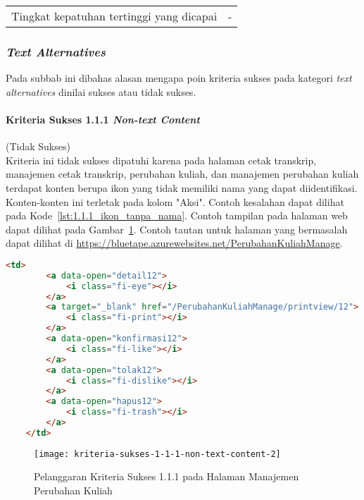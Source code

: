 \begin{center}
\begin{longtable}{|c|c|c|}
    \hline
    \multicolumn{2}{|c|}{Tingkat kepatuhan tertinggi yang dicapai} & - \\

\end{longtable}
\end{center}

\subsubsection{\textit{Text Alternatives}}
\label{subsubsec:kepatuhan_bluetape_text_alternatives}
Pada subbab ini dibahas alasan mengapa poin kriteria sukses pada kategori \textit{text alternatives} dinilai sukses atau tidak sukses.

\paragraph{Kriteria Sukses 1.1.1 \textit{Non-text Content}}
\label{par:kepatuhan_bluetape_kriteria_sukses_1.1.1}
(Tidak Sukses)\\

Kriteria ini tidak sukses dipatuhi karena pada halaman cetak transkrip, manajemen cetak transkrip, perubahan kuliah, dan manajemen perubahan kuliah terdapat konten berupa ikon yang tidak memiliki nama yang dapat diidentifikasi. Konten-konten ini terletak pada kolom "Aksi". Contoh kesalahan dapat dilihat pada \mbox{Kode \ref{lst:1.1.1_ikon_tanpa_nama}}. Contoh tampilan pada halaman web dapat dilihat pada \mbox{Gambar \ref{fig:1.1.1_non_text_content_2}}. Contoh tautan untuk halaman yang bermasalah dapat dilihat di \url{https://bluetape.azurewebsites.net/PerubahanKuliahManage}.
\begin{lstlisting}[frame=single, label={lst:1.1.1_ikon_tanpa_nama}, language=HTML, caption=Pelanggaran Kriteria Sukses 1.1.1 pada Halaman Manajemen Perubahan Kuliah]
    <td>
        <a data-open="detail12">
            <i class="fi-eye"></i>
        </a>
        <a target="_blank" href="/PerubahanKuliahManage/printview/12">
            <i class="fi-print"></i>
        </a>
        <a data-open="konfirmasi12">
            <i class="fi-like"></i>
        </a>  
        <a data-open="tolak12">
            <i class="fi-dislike"></i>
        </a>
        <a data-open="hapus12">
            <i class="fi-trash"></i>
        </a>
    </td>
\end{lstlisting}

\begin{figure}[H]
    \centering  
    \texttt{[image: kriteria-sukses-1-1-1-non-text-content-2]}  
    \caption[Pelanggaran Kriteria Sukses 1.1.1 pada Halaman Manajemen Perubahan Kuliah]{Pelanggaran Kriteria Sukses 1.1.1 pada Halaman Manajemen Perubahan Kuliah}
    \label{fig:1.1.1_non_text_content_2}  
\end{figure} 

